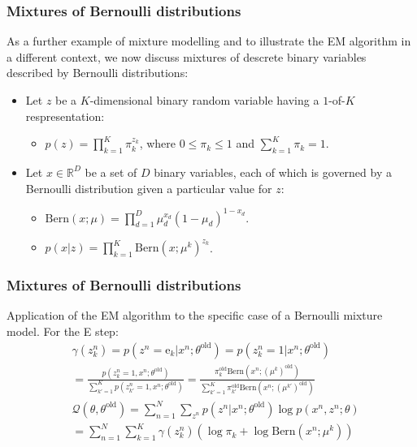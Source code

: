 \documentclass{beamer}
\begin{document}
\begin{frame}
    \frametitle{Mixtures of Bernoulli distributions}
    As a further example of mixture modelling and to illustrate the EM algorithm in a different context, we now discuss mixtures of descrete binary variables described by Bernoulli distributions:
    \begin{itemize}
        \item Let $z$ be a $K$-dimensional binary random variable having a $1$-of-$K$ respresentation:
        \begin{itemize}
            \item $p(z)=\prod_{k=1}^{K}\pi_{k}^{z_{k}}$, where $0\le\pi_{k}\le{}1$ and $\sum_{k=1}^{K}\pi_{k}=1$.
        \end{itemize}
        \item Let $x\in\mathbb{R}^{D}$ be a set of $D$ binary variables, each of which is governed by a Bernoulli distribution given a particular value for $z$:
        \begin{itemize}
            \item $\mathrm{Bern}(x;\mu)=\prod_{d=1}^{D}\mu_{d}^{x_d}(1-\mu_{d})^{1-x_{d}}$.
            \item $p(x|z)=\prod_{k=1}^{K}\mathrm{Bern}(x;\mu^{k})^{z_{k}}$.
        \end{itemize}
    \end{itemize}
\end{frame}

\begin{frame}
    \frametitle{Mixtures of Bernoulli distributions}
    Application of the EM algorithm to the specific case of a Bernoulli mixture model. For the E step:
    \begin{align*}
        &\gamma(z^{n}_{k})=p(z^{n}=\mathrm{e}_{k}|x^{n};\theta^{\textrm{old}})=p(z^{n}_{k}=1|x^{n};\theta^{\textrm{old}}) \\
        &=\frac{p(z^{n}_{k}=1,x^{n};\theta^{\textrm{old}})}{\sum_{k'=1}^{K}p(z^{n}_{k'}=1,x^{n};\theta^{\textrm{old}})}=\frac{\pi_{k}^{\textrm{old}}\mathrm{Bern}(x^{n};(\mu^{k})^{\textrm{old}})}{\sum_{k'=1}^{K}\pi_{k'}^{\textrm{old}}\mathrm{Bern}(x^{n};(\mu^{k'})^{\textrm{old}})} \\
        &\mathcal{Q}(\theta,\theta^{\textrm{old}})=\sum_{n=1}^{N}\sum_{z^{n}}p(z^{n}|x^{n};\theta^{\textrm{old}})\log{}p(x^{n},z^{n};\theta) \\
        &=\sum_{n=1}^{N}\sum_{k=1}^{K}\gamma(z^{n}_{k})(\log\pi_{k}+\log\mathrm{Bern}(x^{n};\mu^{k}))
    \end{align*}
\end{frame}
\end{document}
